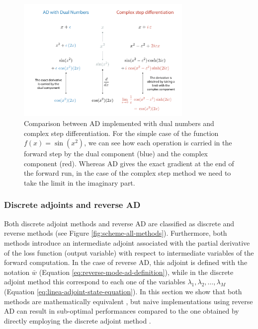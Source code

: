 \begin{figure}[t]
    \centering
    \includegraphics[width=0.75\textwidth]{figures/complex-step-AD.pdf}
    \caption{Comparison between AD implemented with dual numbers and complex step differentiation. For the simple case of the function $f(x) = \sin(x^2)$, we can see how each operation is carried in the forward step by the dual component (blue) and the complex component (red). Whereas AD gives the exact gradient at the end of the forward run, in the case of the complex step method we need to take the limit in the imaginary part. }
    \label{fig:complex-step-AD}
\end{figure}


\subsubsection{Discrete adjoints and reverse AD}
\label{section:comparison-discrete-adjoint-AD}

Both discrete adjoint methods and reverse AD are classified as discrete and reverse methods (see Figure \ref{fig:scheme-all-methods}). 
Furthermore, both methods introduce an intermediate adjoint associated with the partial derivative of the loss function (output variable) with respect to intermediate variables of the forward computation.
In the case of reverse AD, this adjoint is defined with the notation $\bar w$ (Equation \eqref{eq:reverse-mode-ad-definition}), while in the discrete adjoint method this correspond to each one of the variables $\lambda_1, \lambda_2, \ldots, \lambda_M$ (Equation \eqref{eq:linea-adjoint-state-equation}).
In this section we show that both methods are mathematically equivalent \cite{Zhu_Xu_Darve_Beroza_2021, li2020coupled}, but naive implementations using reverse AD can result in sub-optimal performances compared to the one obtained by directly employing the discrete adjoint method \cite{Alexe_Sandu_2009}. 

